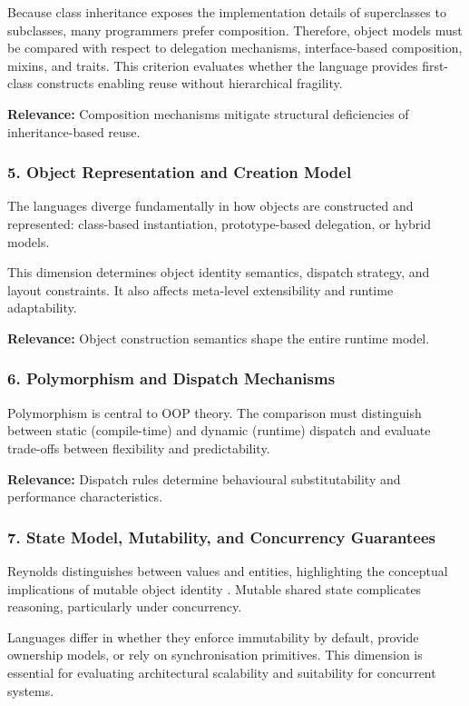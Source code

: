 Because class inheritance exposes the implementation details of superclasses to subclasses, many programmers prefer composition.
Therefore, object models must be compared with respect to delegation mechanisms, interface-based composition, mixins, and traits. This criterion evaluates whether the language provides first-class constructs enabling reuse without hierarchical fragility.

\textbf{Relevance:} Composition mechanisms mitigate structural deficiencies of inheritance-based reuse.

\subsubsection{5. Object Representation and Creation Model}

The languages diverge fundamentally in how objects are constructed and represented: class-based instantiation, prototype-based delegation, or hybrid models.

This dimension determines object identity semantics, dispatch strategy, and layout constraints. It also affects meta-level extensibility and runtime adaptability.

\textbf{Relevance:} Object construction semantics shape the entire runtime model.

\subsubsection{6. Polymorphism and Dispatch Mechanisms}

Polymorphism is central to OOP theory. The comparison must distinguish between static (compile-time) and dynamic (runtime) dispatch and evaluate trade-offs between flexibility and predictability.

\textbf{Relevance:} Dispatch rules determine behavioural substitutability and performance characteristics.

\subsubsection{7. State Model, Mutability, and Concurrency Guarantees}

Reynolds distinguishes between values and entities, highlighting the conceptual implications of mutable object identity \cite{reynolds1985three}. Mutable shared state complicates reasoning, particularly under concurrency.

Languages differ in whether they enforce immutability by default, provide ownership models, or rely on synchronisation primitives. This dimension is essential for evaluating architectural scalability and suitability for concurrent systems.

